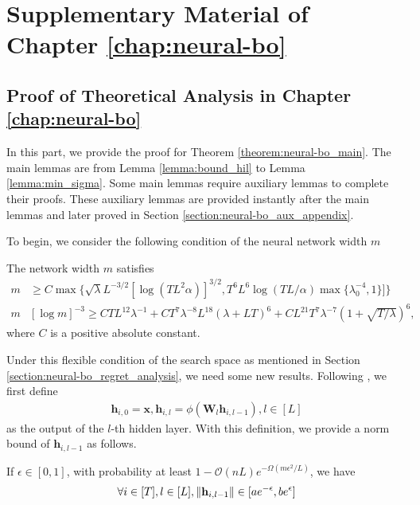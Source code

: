 \chapter{Supplementary Material of Chapter \ref{chap:neural-bo}} 
\label{section:neural-bo_supp}

\section{Proof of Theoretical Analysis in Chapter \ref{chap:neural-bo}}
\label{section:neural-bo_appendix}
In this part, we provide the proof for Theorem \ref{theorem:neural-bo_main}. The main lemmas are from Lemma \ref{lemma:bound_hil} to Lemma \ref{lemma:min_sigma}. Some main lemmas require auxiliary lemmas to complete their proofs. These auxiliary lemmas are provided instantly after the main lemmas and later proved in Section \ref{section:neural-bo_aux_appendix}. 


To begin, we consider the following condition of the neural network width $m$
\begin{condition}
\label{cond:set}
The network width $m$ satisfies
  \begin{align*}
     m & \geq C \max \Big\{ \sqrt{\lambda} L^{-3/2} [\log (TL^2 \alpha)]^{3/2}, T^6 L^6 \log (TL/ \alpha) \max \{\lambda_0^{-4},1 \} ] \Big\} 
     \\
     m  & [\log m ]^{-3} \geq CTL^{12} \lambda^{-1} + CT^7 \lambda^{-8}L^{18}(\lambda + LT)^6 + CL^{21}T^7\lambda^{-7}(1 + \sqrt{T/ \lambda})^6,
    \end{align*} 
    where $C$ is a positive absolute constant.
\end{condition}
Under this flexible condition of the search space as mentioned in Section \ref{section:neural-bo_regret_analysis}, we need some new results. Following \citet{allen2019convergence}, we first define 
\begin{align*}
    \mathbf{h}_{i,0} = \mathbf{x}, \mathbf{h}_{i,l} = \phi(\mathbf{W}_l \mathbf{h}_{i, l-1}), l \in [L]
\end{align*}
as the output of the $l$-th hidden layer. With this definition, we provide a norm bound of $\mathbf{h}_{i, l-1}$ as follows.

\begin{lemma}
\label{lemma:bound_hil}
If $\epsilon \in [0,1]$,  with probability at least $1-\mathcal{O}(nL)e^{-\Omega(m\epsilon^2/L)}$, we have
\[ \forall i \in [T], l \in [L], \norm{\mathbf{h}_{i, l-1}} \in [ae^{-\epsilon}, be^\epsilon] 
\]
\end{lemma}


